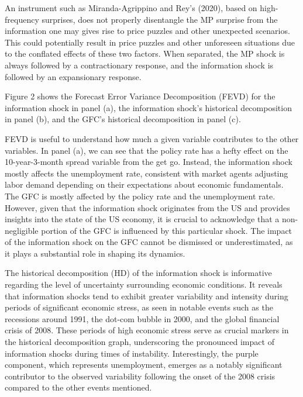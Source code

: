 \documentclass[11pt,a4paper]{article}
\begin{document}
An instrument such as Miranda-Agrippino and Rey's (2020), based on high-frequency surprises, does not properly disentangle the MP surprise from the information one may gives rise to price puzzles and other unexpected scenarios. This could potentially result in price puzzles and other unforeseen situations due to the conflated effects of these two factors. When separated, the MP shock is always followed by a contractionary response, and the information shock is followed by an expansionary response.
    

Figure 2 shows the Forecast Error Variance Decomposition (FEVD) for the information shock in panel (a), the information shock's historical decomposition in panel (b), and the GFC's historical decomposition in panel (c).

FEVD is useful to understand how much a given variable contributes to the other variables. In panel (a), we can see that the policy rate has a hefty effect on the 10-year-3-month spread variable from the get go. Instead, the information shock mostly affects the unemployment rate, consistent with market agents adjusting labor demand depending on their expectations about economic fundamentals.
The GFC is mostly affected by the policy rate and the unemployment rate. 
However, given that the information shock originates from the US and provides insights into the state of the US economy, it is crucial to acknowledge that a non-negligible portion of the GFC is influenced by this particular shock. The impact of the information shock on the GFC cannot be dismissed or underestimated, as it plays a substantial role in shaping its dynamics.


The historical decomposition (HD) of the information shock is informative regarding the level of uncertainty surrounding economic conditions. 
It reveals that information shocks tend to exhibit greater variability and intensity during periods of significant economic stress, as seen in notable events such as the recessions around 1991, the dot-com bubble in 2000, and the global financial crisis of 2008. These periods of high economic stress serve as crucial markers in the historical decomposition graph, underscoring the pronounced impact of information shocks during times of instability.
Interestingly, the purple component, which represents unemployment, emerges as a notably significant contributor to the observed variability following the onset of the 2008 crisis compared to the other events mentioned.
\end{document}
